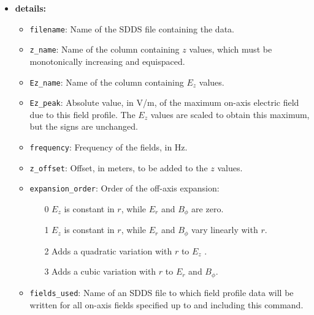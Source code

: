 \begin{itemize}
\item {\bf details:} 
\begin{itemize}
\item {\tt filename}: Name of the SDDS file containing the data.
\item {\tt z\_name}: Name of the column containing $z$ values, which must be monotonically increasing and
  equispaced.
\item {\tt Ez\_name}: Name of the column containing $E_z$ values.
\item {\tt Ez\_peak}: Absolute value, in V/m, of the maximum on-axis electric field due to this field profile.
  The $E_z$ values are scaled to obtain this maximum, but the signs are unchanged.
\item {\tt frequency}: Frequency of the fields, in Hz.
\item {\tt z\_offset}: Offset, in meters, to be added to the $z$ values.
\item {\tt expansion\_order}: Order of the off-axis expansion:
  \begin{itemize}
   \item[0] $E_z$ is constant in $r$, while $E_r$ and $B_\phi$ are zero.
   \item[1] $E_z$ is constant in $r$, while $E_r$ and $B_\phi$ vary linearly with $r$.
   \item[2] Adds a quadratic variation with $r$ to $E_z$ .
   \item[3] Adds a cubic variation with $r$ to $E_r$ and $B_\phi$.
  \end{itemize}
\item {\tt fields\_used}: Name of an SDDS file to which field profile data will be written for all
  on-axis fields specified up to and including this command.
\end{itemize}

\end{itemize}
